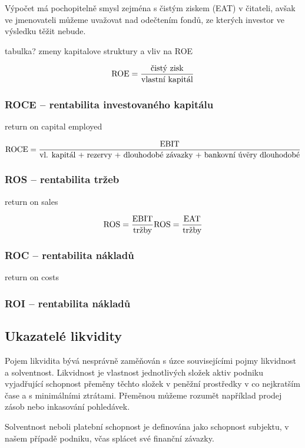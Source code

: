 Výpočet má pochopitelně smysl zejména s čistým ziskem (EAT) v čitateli, avšak ve jmenovateli můžeme uvažovat nad odečtením fondů, ze kterých investor ve výsledku těžit nebude.

tabulka? zmeny kapitalove struktury a vliv na ROE

$$\text{ROE} = \dfrac{\text{čistý zisk}}{\text{vlastní kapitál}}$$ 

\subsubsection{ROCE -- rentabilita investovaného kapitálu}

return on capital employed

$$\text{ROCE} = \dfrac{\text{EBIT}}{\text{vl. kapitál + rezervy + dlouhodobé závazky + bankovní úvěry dlouhodobé}}$$ 

\subsubsection{ROS -- rentabilita tržeb}

return on sales

$$\text{ROS} = \dfrac{\text{EBIT}}{\text{tržby}} \text{ROS} = \dfrac{\text{EAT}}{\text{tržby}}$$ 

\subsubsection{ROC -- rentabilita nákladů}

return on costs

\subsubsection{ROI -- rentabilita nákladů}







\subsection{Ukazatelé likvidity}
Pojem likvidita bývá nesprávně zaměňován s úzce souvisejícími pojmy likvidnost a solventnost. Likvidnost je vlastnost jednotlivých složek aktiv podniku vyjadřující schopnost přeměny těchto složek v peněžní prostředky v co nejkratším čase a s minimálními ztrátami\cite{nyvlt}. Přeměnou můžeme rozumět například prodej zásob nebo inkasování pohledávek. 

Solventnost neboli platební schopnost je definována jako schopnost subjektu, v našem případě podniku, včas splácet své finanční závazky.

